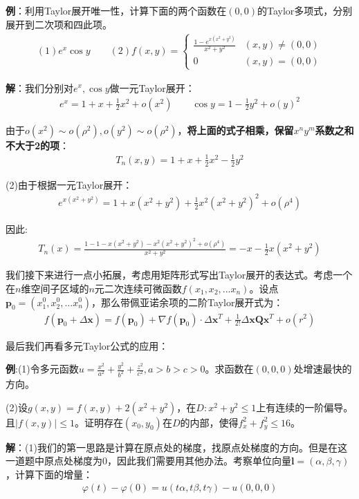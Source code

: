 \documentclass{ctexart}
\let\oldtextbf\textbf %
\renewcommand{\textbf}[1]{\textcolor{btex}{\oldtextbf{#1}}} %
\begin{document}
\textbf{例}：利用Taylor展开唯一性，计算下面的两个函数在$(0,0)$的Taylor多项式，分别展开到二次项和四此项。
\begin{align*}
    (1)e^x\cos y\qquad (2) f(x,y)=\begin{cases}
        \frac{1-e^{x(x^2+y^2)}}{x^2+y^2} &(x,y)\neq (0,0)\\
        0 &(x,y)=(0,0)
    \end{cases}
\end{align*}

\textbf{解}：我们分别对$e^x,\cos y$做一元Taylor展开：
\begin{align*}
    e^x=1+x+\frac{1}{2}x^2+o(x^2)\qquad \cos y=1-\frac{1}{2}y^2+o(y)^2
\end{align*}

由于$o(x^2)\sim o(\rho^2),o(y^2)\sim o(\rho ^2)$，\textbf{将上面的式子相乘，保留$x^ny^m$系数之和不大于2的项}：
\begin{align*}
    T_n(x,y)=1+x+\frac{1}{2}x^2-\frac{1}{2}y^2
\end{align*}

(2)由于根据一元Taylor展开：
\begin{align*}
    e^{x(x^2+y^2)}=1+x(x^2+y^2)+\frac{1}{2}x^2(x^2+y^2)^2+o(\rho^4)
\end{align*}

因此:
\begin{align*}
    T_n(x)=\frac{  1-1-x(x^2+y^2)-x^2(x^2+y^2)^2+o(\rho^4)  }{x^2+y^2}=-x-\frac{1}{2}x(x^2+y^2)
\end{align*}

我们接下来进行一点小拓展，考虑用矩阵形式写出Taylor展开的表达式。考虑一个在$n$维空间子区域的$n$元二次连续可微函数$f(x_1,x_2,...x_n)$。设点$\bm{p}_0=(x_1^0,x_2^0,...x_n^0)$，那么带佩亚诺余项的二阶Taylor展开式为：
\begin{align*}
    f(\bm{p}_0+\Delta\bm{x})=f(\bm{p}_0)+\nabla f(\bm{p}_0)\cdot\Delta \bm{x}^T+\frac{1}{2!}\Delta\bm{x}\bm{Q}\bm{x}^T+o(r^2)\tag{7-14}
\end{align*}

最后我们再看多元Taylor公式的应用：

\textbf{例}:(1)令多元函数$u=\frac{x^2}{a^2}+\frac{y^2}{b^2}+\frac{z^2}{c^2},a>b>c>0$。求函数在$(0,0,0)$处增速最快的方向。

(2)设$g(x,y)=f(x,y)+2(x^2+y^2)$，在$D:x^2+y^2\leq 1$上有连续的一阶偏导。且$|f(x,y)|\leq 1$。证明存在$(x_0,y_0)$在$D$的内部，使得$f_x^2+f_y^2\leq 16$。

\textbf{解}：(1)我们的第一思路是计算在原点处的梯度，找原点处梯度的方向。但是在这一道题中原点处梯度为0，因此我们需要用其他办法。考察单位向量$\bm{l}=(\alpha,\beta,\gamma)$，计算下面的增量：
\begin{align*}
    \varphi(t)-\varphi(0)=u(t\alpha,t\beta,t\gamma)-u(0,0,0)
\end{align*}
\end{document}
